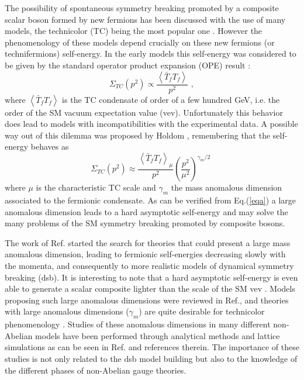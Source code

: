 \documentclass[preprint,amsmath,amssymb,superscriptaddress,showpacs,aps12pt]{revtex4}
\def\be{\begin{equation}}
\def\ee{\end{equation}}
\begin{document}
\par  The possibility of spontaneous symmetry breaking promoted by a composite scalar boson formed by new fermions has been discussed with the use of many models, the technicolor (TC) being the most popular one \cite{tc1}.  However the phenomenology of these models depend crucially on these new fermions (or technifermions) self-energy. In the early models this self-energy was considered to be given by the standard operator product expansion (OPE) result \cite{politzer}:
$$
\Sigma_{TC} (p^2) \propto \frac{\left\langle {\bar{T}_f}T_f\right\rangle}{p^2} \,\, ,
$$
where $\left\langle {\bar{T}_f}T_f\right\rangle$ is the TC condensate of order of a few hundred GeV, i.e. the order of the SM vacuum expectation
value (vev). Unfortunately this behavior does lead to models with incompatibilities with the experimental data.
 A possible way out of this dilemma was proposed by Holdom \cite{holdom}, remembering that the self-energy behaves as
\be 
\Sigma_{TC} (p^2)\approx \frac{\left\langle {\bar{T}_f}T_f\right\rangle_\mu}{p^2} \left(\frac{p^2}{\mu^2}\right)^{\gamma_m /2} \,\, 
\label{eqa}
\ee
where $\mu$ is the characteristic TC scale and $\gamma_m$ the mass anomalous dimension associated to the fermionic condensate. 
As can be verified from Eq.(\ref{eqa}) a large anomalous dimension leads to a hard asymptotic self-energy and may solve the many problems of the SM symmetry breaking promoted by composite bosons. 

\par The work of Ref.\cite{holdom} started the search for theories that could present a large mass anomalous dimension, leading to fermionic
self-energies decreasing slowly with the momenta, and consequently to more realistic models of dynamical symmetry breaking (dsb). It is interesting to note that a hard asymptotic self-energy is even able to generate a scalar composite lighter 
than the scale of the SM vev \cite{us1,us2}. Models proposing such large anomalous dimensions were reviewed in Ref.\cite{yamawaki}, and theories with large anomalous dimensions ($\gamma_m$) are quite desirable for technicolor phenomenology \cite{sannino}. Studies
of these anomalous dimensions in many different non-Abelian models have been performed through analytical methods and lattice 
simulations as can be seen in Ref.\cite{g1,g2,g3,g4,g5,g6,g7} and references therein. 
The importance of these studies is not only related to the dsb model building but also to the knowledge of the different phases of non-Abelian gauge theories.
\end{document}
